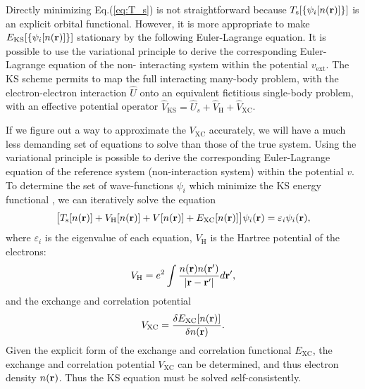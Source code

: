 Directly minimizing Eq.\thinspace(\ref{eq:T_s}) is not straightforward because $T_\text{s}[\{\psi_i[n({\bf r})]\}]$ 
is an explicit orbital functional. However, it is more appropriate to
make $E_{\text{KS}} [\{\psi_i [n({\bf r})]\}]$ stationary by the following Euler-Lagrange equation.
It is possible to use the variational principle to derive the corresponding Euler-Lagrange equation of
the non- interacting system within the potential $v_{\text{ext}}$.
The KS scheme permits to map the full interacting many-body problem, with the electron-electron interaction $\hat U$
onto an equivalent fictitious single-body problem, with an effective potential operator 
$\hat V_{\text{KS}}=\hat U_s + \hat V_{\text{H}} + \hat V_{\text{XC}}$.

If we figure out a way to approximate the $V_{\text{XC}}$ accurately, we will have a much less demanding set of equations 
to solve than those of the true system\cite{Burke07}.
Using the variational principle is possible to derive the corresponding Euler-Lagrange equation of the reference 
system (non-interaction system) within the potential $v$.
To determine the set of wave-functions $\psi_i$ which minimize the KS energy functional , we can iteratively solve the equation
\begin{align}
  \bigl[T_\text{s}[n({\bf {r}})] +V_\text{H}[n({\bf{r}})] +V[n({\bf{r}})]+E_{\text{XC}}[n({\bf{r}})] \bigr]\psi_i({\bf{r}})=\varepsilon_i\psi_i({\bf{r}}), \label{eq:KSE}
\end{align}
where $\varepsilon_i$ is the eigenvalue of each equation, $V_\text{H}$ is the Hartree potential of the electrons:
\begin{align}
 V_{\text H} = e^2 \int\frac{n({\bf r})n({\bf r}') }{|{\bf r}- {\bf r}'|}d{\bf r} ',
 \end{align}
and the exchange and correlation potential
 \begin{align}
 V_{\text {XC}} = \frac{\delta E_{\text{XC}}[n({\bf r})]} {\delta n({\bf r}) }.
 \end{align}
Given the explicit form of the exchange and correlation functional $E_{\text{XC}}$, the exchange and correlation potential $V_{\text {XC}}$ can be determined, and thus electron density $n({\bf r})$. Thus the KS equation must be solved self-consistently.

